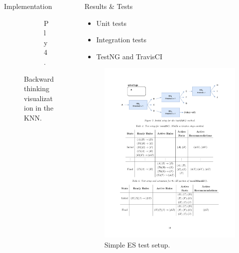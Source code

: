 \documentclass[final]{beamer} %
\begin{document}
\begin{columns}
\begin{column}{.35\textwidth}
\begin{block}{Implementation}
\begin{figure}[!htb]
\begin{subfigure}[!htb]{0.18\columnwidth}
				\caption{Ply 4.}
			\end{subfigure}
			\caption{Backward thinking visualization in the KNN.}
		\end{figure}
	
		\end{block}
	\end{column}
	\begin{column}{.3\textwidth}
		\begin{block}{Results \& Tests}
			\begin{itemize}
				\item Unit tests
				\item Integration tests
				\item TestNG and TravisCI
			\end{itemize}
		
			\begin{figure}[!htb]
				\centering
				\includegraphics[width=\textwidth]{figures/testES.pdf}
				\caption
				{Simple ES test setup.}
			\end{figure}
		

\end{block}
\end{column}
\end{columns}
\end{document}
